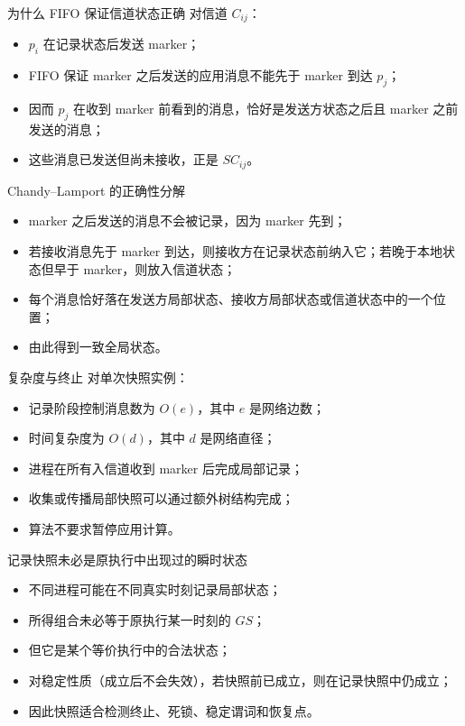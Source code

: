 \documentclass[UTF8,fontset=none,aspectratio=169,10pt]{beamer}
\begin{document}
\begin{frame}{为什么 FIFO 保证信道状态正确}
对信道 $C_{ij}$：
\begin{itemize}
  \item $p_i$ 在记录状态后发送 marker；
  \item FIFO 保证 marker 之后发送的应用消息不能先于 marker 到达 $p_j$；
  \item 因而 $p_j$ 在收到 marker 前看到的消息，恰好是发送方状态之后且 marker 之前发送的消息；
  \item 这些消息已发送但尚未接收，正是 $SC_{ij}$。
\end{itemize}
\end{frame}

\begin{frame}{Chandy--Lamport 的正确性分解}
\begin{itemize}
  \item {}marker 之后发送的消息不会被记录，因为 marker 先到；
  \item {}若接收消息先于 marker 到达，则接收方在记录状态前纳入它；若晚于本地状态但早于 marker，则放入信道状态；
  \item 每个消息恰好落在发送方局部状态、接收方局部状态或信道状态中的一个位置；
  \item 由此得到一致全局状态。
\end{itemize}
\end{frame}

\begin{frame}{复杂度与终止}
对单次快照实例：
\begin{itemize}
  \item 记录阶段控制消息数为 $O(e)$，其中 $e$ 是网络边数；
  \item 时间复杂度为 $O(d)$，其中 $d$ 是网络直径；
  \item 进程在所有入信道收到 marker 后完成局部记录；
  \item 收集或传播局部快照可以通过额外树结构完成；
  \item 算法不要求暂停应用计算。
\end{itemize}
\end{frame}

\begin{frame}{记录快照未必是原执行中出现过的瞬时状态}
\begin{itemize}
  \item 不同进程可能在不同真实时刻记录局部状态；
  \item 所得组合未必等于原执行某一时刻的 $GS$；
  \item 但它是某个等价执行中的合法状态；
  \item 对稳定性质（成立后不会失效），若快照前已成立，则在记录快照中仍成立；
  \item 因此快照适合检测终止、死锁、稳定谓词和恢复点。
\end{itemize}
\end{frame}
\end{document}
